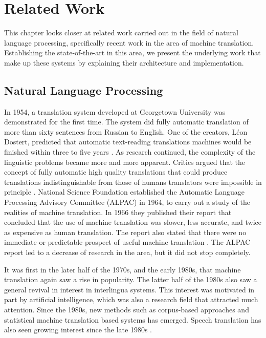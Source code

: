 
\chapter{Related Work}
\label{ch:related_work}
This chapter looks closer at related work carried out in the field of natural language processing, specifically recent work in the area of machine translation. Establishing the state-of-the-art in this area, we present the underlying work that make up these systems by explaining their architecture and implementation.


\section{Natural Language Processing}
\label{sec:natural_language_processing}
In 1954, a translation system developed at Georgetown University was demonstrated for the first time. The system did fully automatic translation of more than sixty sentences from Russian to English. One of the creators, Léon Dostert, predicted that automatic text-reading translations machines would be finished within three to five years \citep{hutchins1997first}. As research continued, the complexity of the linguistic problems became more and more apparent. Critics argued that the concept of fully automatic high quality translations that could produce translations indistinguishable from those of humans translators were impossible in principle \citep{hutchins2007machine}. National Science Foundation established the Automatic Language Processing Advisory Committee (ALPAC) in 1964, to carry out a study of the realities of machine translation. In 1966 they published their report that concluded that the use of machine translation was slower, less accurate, and twice as expensive as human translation. The report also stated that there were no immediate or predictable prospect of useful machine translation \citep{hutchins2007machine, national1966language, koehn2010statistical}. The ALPAC report led to a decrease of research in the area, but it did not stop completely.

It was first in the later half of the 1970s, and the early 1980s, that machine translation again saw a rise in popularity. The latter half of the 1980s also saw a general revival in interest in interlingua systems. This interest was motivated in part by artificial intelligence, which was also a research field that attracted much attention. Since the 1980s, new methods such as corpus-based approaches and statistical machine translation based systems has emerged. Speech translation has also seen growing interest since the late 1980s \citep{hutchins2007machine}.

